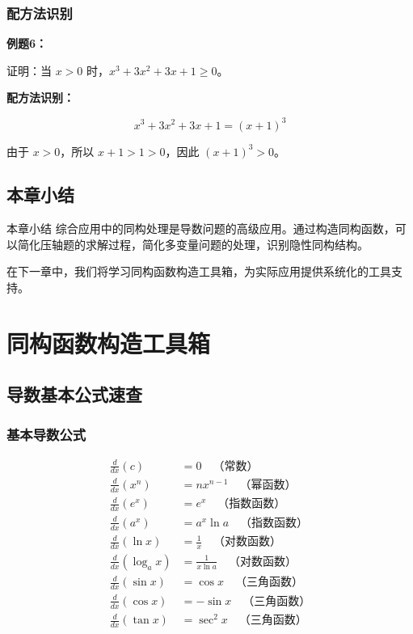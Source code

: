 \documentclass[a4paper,11pt]{ctexrep}
\newcommand{\exampleicon}{\ModeBadge[highlight]{例题}}
\newcommand{\analysisicon}{\ModeBadge[secondary]{分析}}
\theoremstyle{definition}
\begin{document}
\subsection{配方法识别}

\exampleicon \textbf{例题6：}

证明：当 $x > 0$ 时，$x^3 + 3x^2 + 3x + 1 \geq 0$。

\analysisicon \textbf{配方法识别：}

$$x^3 + 3x^2 + 3x + 1 = (x+1)^3$$

由于 $x > 0$，所以 $x+1 > 1 > 0$，因此 $(x+1)^3 > 0$。

\section{本章小结}

\begin{summarybox}{本章小结}
综合应用中的同构处理是导数问题的高级应用。通过构造同构函数，可以简化压轴题的求解过程，简化多变量问题的处理，识别隐性同构结构。

在下一章中，我们将学习同构函数构造工具箱，为实际应用提供系统化的工具支持。
\end{summarybox}

\chapter{同构函数构造工具箱}

\section{导数基本公式速查}

\subsection{基本导数公式}

\begin{definitionbox}[基本导数公式]
\begin{align}
\frac{d}{dx}(c) &= 0 \quad \text{（常数）} \\
\frac{d}{dx}(x^n) &= nx^{n-1} \quad \text{（幂函数）} \\
\frac{d}{dx}(e^x) &= e^x \quad \text{（指数函数）} \\
\frac{d}{dx}(a^x) &= a^x \ln a \quad \text{（指数函数）} \\
\frac{d}{dx}(\ln x) &= \frac{1}{x} \quad \text{（对数函数）} \\
\frac{d}{dx}(\log_a x) &= \frac{1}{x \ln a} \quad \text{（对数函数）} \\
\frac{d}{dx}(\sin x) &= \cos x \quad \text{（三角函数）} \\
\frac{d}{dx}(\cos x) &= -\sin x \quad \text{（三角函数）} \\
\frac{d}{dx}(\tan x) &= \sec^2 x \quad \text{（三角函数）}
\end{align}
\end{definitionbox}
\end{document}
